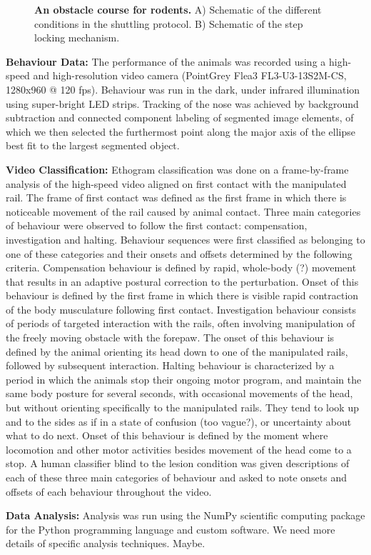 \begin{figure}
\centering

\caption{\textbf{An obstacle course for rodents.} A) Schematic of the different conditions in the shuttling protocol. B) Schematic of the step locking mechanism.}
\label{fig:assay}
\end{figure}

\textbf{Behaviour Data:} The performance of the animals was recorded using a high-speed and high-resolution video camera (PointGrey Flea3 FL3-U3-13S2M-CS, 1280x960 @ 120 fps). Behaviour was run in the dark, under infrared illumination using super-bright LED strips. Tracking of the nose was achieved by background subtraction and connected component labeling of segmented image elements, of which we then selected the furthermost point along the major axis of the ellipse best fit to the largest segmented object.

\textbf{Video Classification:} Ethogram classification was done on a frame-by-frame analysis of the high-speed video aligned on first contact with the manipulated rail. The frame of first contact was defined as the first frame in which there is noticeable movement of the rail caused by animal contact. Three main categories of behaviour were observed to follow the first contact: compensation, investigation and halting. Behaviour sequences were first classified as belonging to one of these categories and their onsets and offsets determined by the following criteria. Compensation behaviour is defined by rapid, whole-body (?) movement that results in an adaptive postural correction to the perturbation. Onset of this behaviour is defined by the first frame in which there is visible rapid contraction of the body musculature following first contact. Investigation behaviour consists of periods of targeted interaction with the rails, often involving manipulation of the freely moving obstacle with the forepaw. The onset of this behaviour is defined by the animal orienting its head down to one of the manipulated rails, followed by subsequent interaction. Halting behaviour is characterized by a period in which the animals stop their ongoing motor program, and maintain the same body posture for several seconds, with occasional movements of the head, but without orienting specifically to the manipulated rails. They tend to look up and to the sides as if in a state of confusion (too vague?), or uncertainty about what to do next. Onset of this behaviour is defined by the moment where locomotion and other motor activities besides movement of the head come to a stop. A human classifier blind to the lesion condition was given descriptions of each of these three main categories of behaviour and asked to note onsets and offsets of each behaviour throughout the video.

\textbf{Data Analysis:} Analysis was run using the NumPy scientific computing package for the Python programming language and custom software. We need more details of specific analysis techniques. Maybe.
